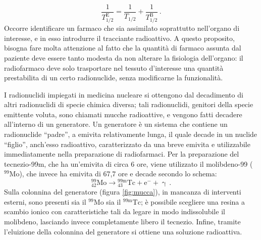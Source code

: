 \documentclass{report}
\newcommand{\virgolette}[1]{``#1''}
\newcommand{\figref}[1]{figura \ref{#1}}
\numberwithin{equation}{section}
\numberwithin{figure}{section}
\begin{document}
\begin{equation}
    \frac{1}{T_{1/2}^\mathrm{E}} = \frac{1}{T_{1/2}} + \frac{1}{T_{1/2}^\mathrm{B}}\,.
\end{equation}
Occorre identificare un farmaco che sia assimilato soprattutto nell'organo di interesse, e in esso introdurre il tracciante radioattivo. A questo proposito, bisogna fare molta attenzione al fatto che la quantità di farmaco assunta dal paziente deve essere tanto modesta da non alterare la fisiologia dell'organo: il radiofarmaco deve solo trasportare nel tessuto d'interesse una quantità prestabilita di un certo radionuclide, senza modificarne la funzionalità.

I radionuclidi impiegati in medicina nucleare si ottengono dal decadimento di altri radionuclidi di specie chimica diversa; tali radionuclidi, genitori della specie emittente voluta, sono chiamati mucche radioattive, e vengono fatti decadere all'interno di un generatore. Un generatore è un sistema che contiene un radionuclide \virgolette{padre}, a emivita relativamente lunga, il quale decade in un nuclide \virgolette{figlio}, anch'esso radioattivo, caratterizzato da una breve emivita e utilizzabile immediatamente nella preparazione di radiofarmaci.
Per la preparazione del tecnezio-99m, che ha un'emivita di circa 6 ore, viene utilizzato il molibdeno-99 ($\mathrm{^{99}Mo}$), che invece ha emivita di 67,7 ore e decade secondo lo schema:
\begin{equation*}
    \mathrm{^{99}_{42}Mo} \to \mathrm{^{99m}_{43}Tc} + \mathrm{e}^- + \upgamma\,.
\end{equation*}
Sulla colonnina del generatore (\figref{fig:mucca}), in mancanza di interventi esterni, sono  presenti sia il $\mathrm{^{99}Mo}$ sia il $\mathrm{^{99m}Tc}$; è possibile scegliere una resina a scambio ionico con caratteristiche tali da legare in modo indissolubile il molibdeno, lasciando invece completamente libero il tecnezio. Infine, tramite l’eluizione della colonnina del generatore si ottiene una soluzione radioattiva.
\end{document}
